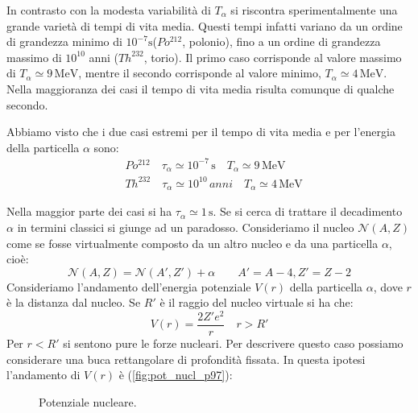 In contrasto con la modesta variabilità di $T_{\alpha}$ si riscontra
sperimentalmente una grande varietà di tempi di vita media. Questi tempi 
infatti
variano da un ordine di grandezza minimo di $10^{-7}\si{\second}$($Po^{212}$,
polonio), fino a un ordine di grandezza massimo di $10^{10}$ anni ($Th^{232}$,
torio). Il primo caso corrisponde al valore massimo di $T_{\alpha}\simeq
9\,\si{\mega\electronvolt}$, mentre il secondo corrisponde al valore minimo,
$T_{\alpha}\simeq 4\,\si{\mega\electronvolt}$. Nella maggioranza dei casi il
tempo di vita media risulta comunque di qualche secondo.

\breaknote

Abbiamo visto che i due casi estremi per il tempo di vita
media e per l'energia della particella $\alpha$ sono:
\begin{align*}
&Po^{212}\quad\tau_{\alpha}\simeq 10^{-7}\,\si{\second}\quad T_{\alpha}\simeq 
9\,\si{\mega\electronvolt}\\
&Th^{232}\quad\tau_{\alpha}\simeq 10^{10}\,anni\quad T_{\alpha}\simeq 
4\,\si{\mega\electronvolt}
\end{align*}

Nella maggior parte dei casi si ha $\tau_{\alpha}\simeq 1\,\si{\second}$. Se si
cerca di trattare il decadimento $\alpha$ in termini classici si giunge ad un
paradosso. Consideriamo il nucleo $\mathcal{N}(A,Z)$ come se fosse virtualmente
composto da un altro nucleo e da una particella $\alpha$, cioè:
\[
\mathcal{N}(A,Z)=\mathcal{N}(A',Z')+\alpha\qquad A'=A-4,Z'=Z-2
\]
Consideriamo l'andamento dell'energia potenziale $V(r)$ della particella
$\alpha$, dove $r$ è la distanza dal nucleo. Se $R'$ è il raggio del nucleo
virtuale si ha che:
\[
V(r)=\frac{2Z'e^2}{r}\quad r>R'
\]
Per $r<R'$ si sentono pure le forze nucleari. Per descrivere questo caso
possiamo considerare una buca rettangolare di profondità fissata. In questa
ipotesi l'andamento di $V(r)$ è (\autoref{fig:pot_nucl_p97}):

\begin{figure}[hbtp]
\centering
\caption{Potenziale nucleare.}
\label{fig:pot_nucl_p97}

\end{figure}

